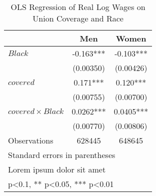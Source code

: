 \begin{table}[htbp]\centering
\def\sym#1{\ifmmode^{#1}\else\(^{#1}\)\fi}
\caption{OLS Regression of Real Log Wages on Union Coverage and Race}
\begin{tabular}{l*{2}{c}}
\hline\hline
                    &\multicolumn{1}{c}{Men}&\multicolumn{1}{c}{Women}\\
\hline
$ Black $           &      -0.163***&      -0.103***\\
                    &   (0.00350)   &   (0.00426)   \\
[1em]
$ covered $         &       0.171***&       0.120***\\
                    &   (0.00755)   &   (0.00700)   \\
[1em]
$ covered \times Black $&      0.0262***&      0.0405***\\
                    &   (0.00770)   &   (0.00806)   \\
\hline
Observations        &      628445   &      648645   \\
\hline\hline
\multicolumn{3}{l}{\footnotesize Standard errors in parentheses}\\
\multicolumn{3}{l}{\footnotesize Lorem ipsum dolor sit amet}\\
\multicolumn{3}{l}{\footnotesize * p<0.1, ** p<0.05, *** p<0.01}\\
\end{tabular}
\end{table}
